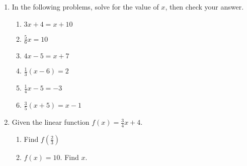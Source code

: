 \documentclass[12pt, twoside]{article}
\begin{document}
\begin{enumerate}
\newpage
\item In the following problems, solve for the value of $x$, then check your answer.
\begin{multicols}{2}
  \begin{enumerate}[itemsep=5cm]
    \item $3x + 4 = x + 10$
    \item $\frac{5}{6}x = 10$
    \item $4x - 5 = x + 7$
    \item $\frac{1}{3}(x - 6) = 2$
    \item $\frac{1}{4} x - 5 = -3$
    \item $\frac{3}{5}(x + 5) = x - 1$
  \end{enumerate}
  \end{multicols} \vspace{4cm}


\item Given the linear function $f(x)=\frac{3}{4}x+4$.
\begin{multicols}{2}
\begin{enumerate}
  \item Find $f(\frac{2}{3})$ %
  \item $f(x)=10$. Find $x$. %
\end{enumerate}
\end{multicols}


\end{enumerate}
\end{document}
